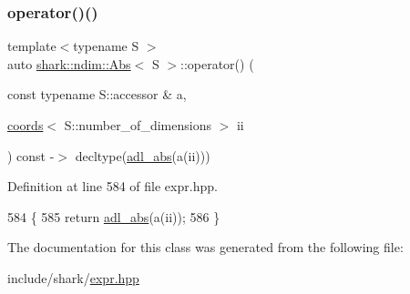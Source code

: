 \subsubsection{\texorpdfstring{operator()()}{operator()()}}
{\footnotesize\ttfamily template$<$typename S $>$ \\
auto \hyperlink{classshark_1_1ndim_1_1_abs}{shark\+::ndim\+::\+Abs}$<$ S $>$\+::operator() (\begin{DoxyParamCaption}\item[{const typename S\+::accessor \&}]{a,  }\item[{\hyperlink{structshark_1_1ndim_1_1coords}{coords}$<$ S\+::number\+\_\+of\+\_\+dimensions $>$}]{ii }\end{DoxyParamCaption}) const -\/$>$ decltype(\hyperlink{namespaceshark_a01c919545e5586af9484f058f38774b6}{adl\+\_\+abs}(a(ii))) \hspace{0.3cm}{\ttfamily [inline]}}



Definition at line 584 of file expr.\+hpp.


\begin{DoxyCode}
584                                                                                                            
                        \{
585                 \textcolor{keywordflow}{return} \hyperlink{namespaceshark_a01c919545e5586af9484f058f38774b6}{adl\_abs}(a(ii));
586             \}
\end{DoxyCode}


The documentation for this class was generated from the following file\+:\begin{DoxyCompactItemize}
\item 
include/shark/\hyperlink{expr_8hpp}{expr.\+hpp}\end{DoxyCompactItemize}
